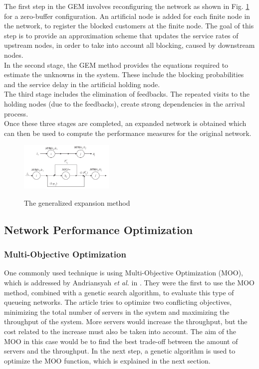 \documentclass[twoside]{article}
\begin{document}
\begin{multicols}{2}
The first step in the GEM involves reconfiguring the network as shown in Fig. \ref{fig:gem} for a zero-buffer configuration. An artificial node is added for each finite node in the network, to register the blocked customers at the finite node. The goal of this step is to provide an approximation scheme that updates the service rates of upstream nodes, in order to take into account all blocking, caused by downstream nodes.\\
In the second stage, the GEM method provides the equations required to estimate the unknowns in the system. These include the blocking probabilities and the service delay in the artificial holding node.\\ The third stage includes the elimination of feedbacks. The repeated visits to the holding nodes (due to the feedbacks), create strong dependencies in the arrival process.\\
Once these three stages are completed, an expanded network is obtained which can then be used to compute the performance measures for the original network. 
\begin{figure}[H]
  \centering
\caption{The generalized expansion method}
  \includegraphics[width=0.4\textwidth]{assets/gem}
\label{fig:gem}
\end{figure}

\subsection{\textbf{Network Performance Optimization}}
\subsubsection{Multi-Objective Optimization}
One commonly used technique is using Multi-Objective Optimization (MOO), which is addressed by Andriansyah \textit{et al.} in \cite{own}. They were the first to use the MOO method, combined with a genetic search algorithm, to evaluate this type of queueing networks. The article tries to optimize two conflicting objectives, minimizing the total number of servers in the system and maximizing the throughput of the system. More servers would increase the throughput, but the cost related to the increase must also be taken into account. The aim of the MOO in this case would be to find the best trade-off between the amount of servers and the throughput. In the next step, a genetic algorithm is used to optimize the MOO function, which is explained in the next section.


\end{multicols}
\end{document}
